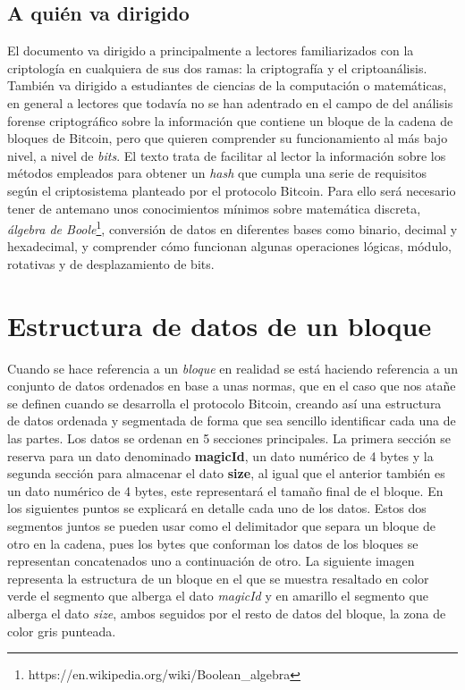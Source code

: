 \documentclass{article}
\begin{document}
    \subsection{A quién va dirigido}
    El documento va dirigido a principalmente a lectores familiarizados con la criptología en cualquiera de sus dos ramas: la criptografía y el criptoanálisis. También va dirigido a estudiantes de ciencias de la computación o matemáticas, en general a lectores que todavía no se han adentrado en el campo de del análisis forense criptográfico sobre la información que contiene un bloque de la cadena de bloques de Bitcoin, pero que quieren comprender su funcionamiento al más bajo nivel, a nivel de \textit{bits}. El texto trata de facilitar al lector la información sobre los métodos empleados para obtener un \textit{hash} que cumpla una serie de requisitos según el criptosistema planteado por el protocolo Bitcoin. Para ello será necesario tener de antemano unos conocimientos mínimos sobre matemática discreta, \textit{álgebra de Boole}\footnote{https://en.wikipedia.org/wiki/Boolean\_algebra}, conversión de datos en diferentes bases como binario, decimal y hexadecimal, y comprender cómo funcionan algunas operaciones lógicas, módulo, rotativas y de desplazamiento de bits.

\section{Estructura de datos de un bloque}
    
    \vspace{3mm}
    
    Cuando se hace referencia a un \textit{bloque} en realidad se está haciendo referencia a un conjunto de datos ordenados en base a unas normas, que en el caso que nos atañe se definen cuando se desarrolla el protocolo Bitcoin, creando así una estructura de datos ordenada y segmentada de forma que sea sencillo identificar cada una de las partes. Los datos se ordenan en 5 secciones principales. La primera sección se reserva para un dato denominado \textbf{magicId}, un dato numérico de 4 bytes y la segunda sección para almacenar el dato \textbf{size}, al igual que el anterior también es un dato numérico de 4 bytes, este representará el tamaño final de el bloque. En los siguientes puntos se explicará en detalle cada uno de los datos. Estos dos segmentos juntos se pueden usar como el delimitador que separa un bloque de otro en la cadena, pues los bytes que conforman los datos de los bloques se representan concatenados uno a continuación de otro. La siguiente imagen representa la estructura de un bloque en el que se muestra resaltado en color verde el segmento que alberga el dato \textit{magicId} y en amarillo el segmento que alberga el dato \textit{size}, ambos seguidos por el resto de datos del bloque, la zona de color gris punteada.
    
\end{document}
